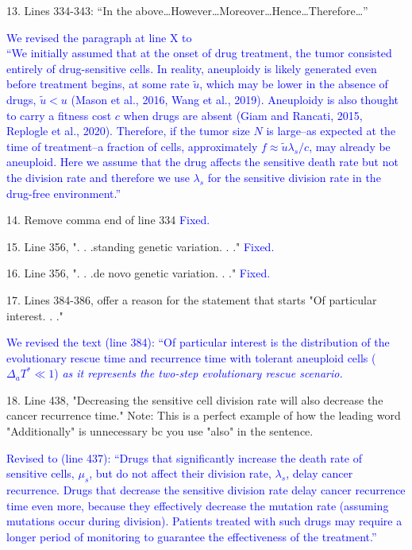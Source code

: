 \documentclass[12pt]{extarticle}
\begin{document}
13. Lines 334-343: ``In the above\ldots However\ldots Moreover\ldots Hence\dots Therefore\ldots ''

\textcolor{blue}{We revised the paragraph at line X to \\
``We initially assumed that at the onset of drug treatment, the tumor consisted entirely of drug-sensitive cells. In reality, aneuploidy is likely generated even before treatment begins, at some rate $\tilde{u}$, which may be lower in the absence of drugs, $\tilde{u} < u$ (Mason et al., 2016, Wang et al., 2019). 
Aneuploidy is also thought to carry a fitness cost $c$ when drugs are absent (Giam and Rancati, 2015, Replogle et al., 2020). 
Therefore, if the tumor size $N$ is large--as expected at the time of treatment--a fraction of cells, approximately $f \approx \tilde{u}\lambda_s/c$, may already be aneuploid.
Here we assume that the drug affects the sensitive death rate but not the division rate and therefore we use $\lambda_s$ for the sensitive division rate in the drug-free environment.''}

14. Remove comma end of line 334
\textcolor{blue}{Fixed. }%

15. Line 356, ". . .standing genetic variation. . ."
\textcolor{blue}{Fixed. }%

16. Line 356, ". . .de novo genetic variation. . ."
\textcolor{blue}{Fixed.}

17. Lines 384-386, offer a reason for the statement that starts "Of particular interest. . ."

\textcolor{blue}{We revised the text (line 384): ``Of particular interest is the distribution of the evolutionary rescue time and recurrence time with tolerant aneuploid cells ($\Delta_a T^*\ll1$) \emph{as it represents the two-step evolutionary rescue scenario.}}

18. Line 438, "Decreasing the sensitive cell division rate will also decrease the cancer recurrence time." Note: This is a perfect example of how the leading word "Additionally" is unnecessary bc you use "also" in the sentence.

\textcolor{blue}{Revised to (line 437): ``Drugs that significantly increase the death rate of sensitive cells, $\mu_s$, but do not affect their division rate, $\lambda_s$, delay cancer recurrence. Drugs that decrease the sensitive division rate delay cancer recurrence time even more, because they effectively decrease the mutation rate (assuming mutations occur during division).  Patients treated with such drugs may require a longer period of monitoring to guarantee the effectiveness of the treatment.''}
\end{document}
